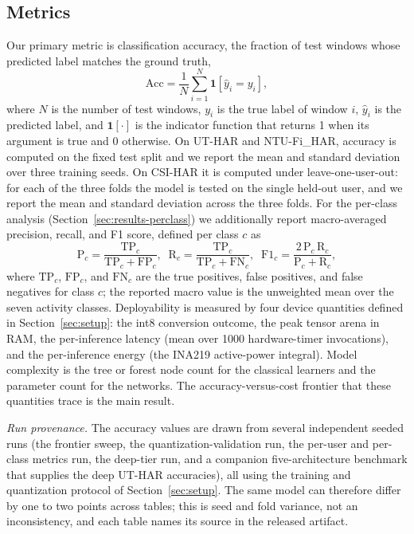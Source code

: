 \documentclass{ieeeaccess}
\begin{document}
\subsection{Metrics}
Our primary metric is classification accuracy, the fraction of test windows whose predicted label matches the ground truth,
\begin{equation}
\mathrm{Acc} = \frac{1}{N}\sum_{i=1}^{N}\mathbf{1}\!\left[\hat{y}_i = y_i\right],
\end{equation}
where $N$ is the number of test windows, $y_i$ is the true label of window $i$, $\hat{y}_i$ is the predicted label, and $\mathbf{1}[\cdot]$ is the indicator function that returns 1 when its argument is true and 0 otherwise. On UT-HAR and NTU-Fi\_HAR, accuracy is computed on the fixed test split and we report the mean and standard deviation over three training seeds. On CSI-HAR it is computed under leave-one-user-out: for each of the three folds the model is tested on the single held-out user, and we report the mean and standard deviation across the three folds. For the per-class analysis (Section~\ref{sec:results-perclass}) we additionally report macro-averaged precision, recall, and F1 score, defined per class $c$ as
\begin{equation}
\mathrm{P}_c = \frac{\mathrm{TP}_c}{\mathrm{TP}_c+\mathrm{FP}_c},\;\;
\mathrm{R}_c = \frac{\mathrm{TP}_c}{\mathrm{TP}_c+\mathrm{FN}_c},\;\;
\mathrm{F1}_c = \frac{2\,\mathrm{P}_c\,\mathrm{R}_c}{\mathrm{P}_c+\mathrm{R}_c},
\end{equation}
where $\mathrm{TP}_c$, $\mathrm{FP}_c$, and $\mathrm{FN}_c$ are the true positives, false positives, and false negatives for class $c$; the reported macro value is the unweighted mean over the seven activity classes. Deployability is measured by four device quantities defined in Section~\ref{sec:setup}: the int8 conversion outcome, the peak tensor arena in RAM, the per-inference latency (mean over 1000 hardware-timer invocations), and the per-inference energy (the INA219 active-power integral). Model complexity is the tree or forest node count for the classical learners and the parameter count for the networks. The accuracy-versus-cost frontier that these quantities trace is the main result.

\emph{Run provenance.} The accuracy values are drawn from several independent seeded runs (the frontier sweep, the quantization-validation run, the per-user and per-class metrics run, the deep-tier run, and a companion five-architecture benchmark that supplies the deep UT-HAR accuracies), all using the training and quantization protocol of Section~\ref{sec:setup}. The same model can therefore differ by one to two points across tables; this is seed and fold variance, not an inconsistency, and each table names its source in the released artifact.
\end{document}
